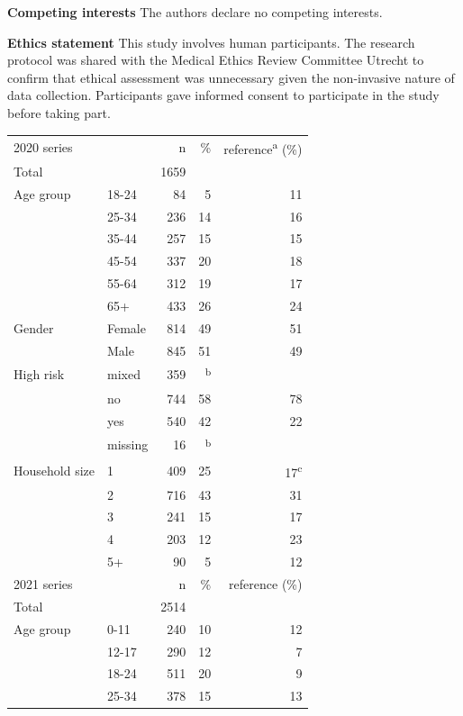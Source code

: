 \documentclass[fleqn,10pt]{wlscirep}
\begin{document}
\textbf{Competing interests} The authors declare no competing interests.

\noindent \textbf{Ethics statement} This study involves human participants. The research protocol was shared with the Medical Ethics Review Committee Utrecht to confirm that ethical assessment was unnecessary given the non-invasive nature of data collection. Participants gave informed consent to participate in the study before taking part.

\clearpage

\begin{table}[ht]
\centering
\begin{tabular}{llrrr}
  \hline
  \hline
  2020 series & & n & \% & reference\textsuperscript{a} (\%) \\ 
  Total & & 1659 & & \\
  \hline
  Age group & 18-24 & 84 & 5 & 11 \\ 
   & 25-34 & 236 & 14 & 16 \\ 
   & 35-44 & 257 & 15 & 15 \\ 
   & 45-54 & 337 & 20 & 18 \\ 
   & 55-64 & 312 & 19 & 17 \\ 
   & 65+ & 433 & 26 & 24 \\ 
  \hline
  Gender & Female & 814 & 49 & 51 \\ 
   & Male & 845 & 51 & 49 \\ 
  \hline
  High risk & mixed & 359 & \textsuperscript{b} &  \\ 
   & no & 744 & 58 & 78 \\ 
   & yes & 540 & 42 & 22 \\ 
   & missing & 16 & \textsuperscript{b} &  \\ 
  \hline
  Household size & 1 & 409 & 25 & 17\textsuperscript{c} \\ 
   & 2 & 716 & 43 & 31 \\ 
   & 3 & 241 & 15 & 17 \\ 
   & 4 & 203 & 12 & 23 \\ 
   & 5+ & 90 & 5 & 12 \\ 
  \hline
  \hline
  2021 series & & n & \% & reference (\%) \\ 
  Total & & 2514 & & \\
  \hline
  Age group & 0-11 & 240 & 10 & 12 \\ 
   & 12-17 & 290 & 12 & 7 \\ 
   & 18-24 & 511 & 20 & 9 \\ 
   & 25-34 & 378 & 15 & 13 \\ 

\end{tabular}
\end{table}
\end{document}
